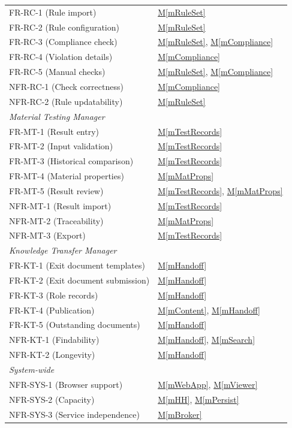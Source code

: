 \documentclass[12pt, titlepage]{article}
\newcommand{\mref}[1]{\hyperref[#1:dec]{M\ref*{#1}}}
\begin{document}
\begin{longtable}{p{} p{}}
FR-RC-1 (Rule import) & \mref{mRuleSet}\\
FR-RC-2 (Rule configuration) & \mref{mRuleSet}\\
FR-RC-3 (Compliance check) & \mref{mRuleSet}, \mref{mCompliance}\\
FR-RC-4 (Violation details) & \mref{mCompliance}\\
FR-RC-5 (Manual checks) & \mref{mRuleSet}, \mref{mCompliance}\\
NFR-RC-1 (Check correctness) & \mref{mCompliance}\\
NFR-RC-2 (Rule updatability) & \mref{mRuleSet}\\
\midrule
\multicolumn{2}{l}{\emph{Material Testing Manager}}\\
FR-MT-1 (Result entry) & \mref{mTestRecords}\\
FR-MT-2 (Input validation) & \mref{mTestRecords}\\
FR-MT-3 (Historical comparison) & \mref{mTestRecords}\\
FR-MT-4 (Material properties) & \mref{mMatProps}\\
FR-MT-5 (Result review) & \mref{mTestRecords}, \mref{mMatProps}\\
NFR-MT-1 (Result import) & \mref{mTestRecords}\\
NFR-MT-2 (Traceability) & \mref{mMatProps}\\
NFR-MT-3 (Export) & \mref{mTestRecords}\\
\midrule
\multicolumn{2}{l}{\emph{Knowledge Transfer Manager}}\\
FR-KT-1 (Exit document templates) & \mref{mHandoff}\\
FR-KT-2 (Exit document submission) & \mref{mHandoff}\\
FR-KT-3 (Role records) & \mref{mHandoff}\\
FR-KT-4 (Publication) & \mref{mContent}, \mref{mHandoff}\\
FR-KT-5 (Outstanding documents) & \mref{mHandoff}\\
NFR-KT-1 (Findability) & \mref{mHandoff}, \mref{mSearch}\\
NFR-KT-2 (Longevity) & \mref{mHandoff}\\
\midrule
\multicolumn{2}{l}{\emph{System-wide}}\\
NFR-SYS-1 (Browser support) & \mref{mWebApp}, \mref{mViewer}\\
NFR-SYS-2 (Capacity) & \mref{mHH}, \mref{mPersist}\\
NFR-SYS-3 (Service independence) & \mref{mBroker}\\

\end{longtable}
\end{document}
